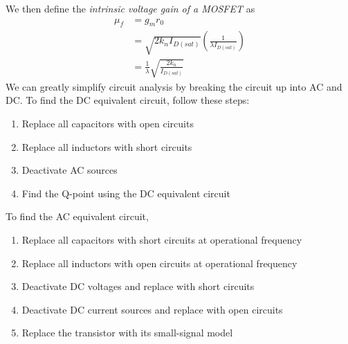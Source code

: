 \documentclass[nobib]{tufte-handout}
\begin{document}
We then define the \emph{intrinsic voltage gain of a MOSFET}
as 
\begin{align} \label{eq:26}
    \mu_f &= g_m r_0 \\
    &= \sqrt{2k_n I_{D(sat)}} \left( \frac{1}{\lambda I_{D(sat)}} \right) \\
    &= \frac{1}{\lambda} \sqrt{\frac{2k_n}{I_{D(sat)}}}
\end{align}
We can greatly simplify circuit analysis 
by breaking the circuit up into 
AC and DC. To find the DC equivalent 
circuit, follow these steps: 
\begin{enumerate}
    \item Replace all capacitors with open circuits
    \item Replace all inductors with short circuits
    \item Deactivate AC sources 
    \item Find the Q-point using the DC equivalent circuit
\end{enumerate}
To find the AC equivalent circuit, 
\begin{enumerate}
    \item Replace all capacitors with short circuits at operational frequency
    \item Replace all inductors with open circuits at operational frequency
    \item Deactivate DC voltages and replace with short circuits 
    \item Deactivate DC current sources and replace with open circuits 
    \item Replace the transistor with its small-signal model 
\end{enumerate}
\end{document}
